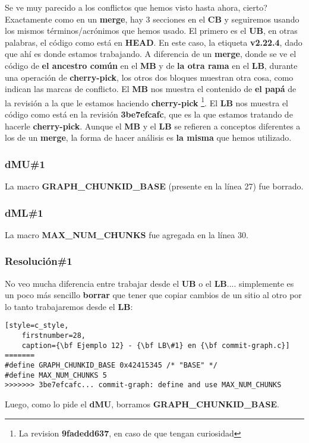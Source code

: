 Se ve muy parecido a los conflictos que hemos visto hasta ahora, cierto? Exactamente como en un {\bf merge}, hay 3 secciones
en el {\bf CB} y seguiremos usando los mismos términos/acrónimos que hemos usado. El primero es el {\bf UB}, en otras palabras,
el código como está en {\bf HEAD}. En este caso, la etiqueta {\bf v2.22.4}, dado que ahí es donde estamos trabajando. A diferencia
de un {\bf merge}, donde se ve el código de {\bf el ancestro común} en el {\bf MB} y de {\bf la otra rama} en el {\bf LB},
durante una operación de {\bf cherry-pick}, los otros dos bloques muestran otra cosa, como indican las marcas de conflicto.
El {\bf MB} nos muestra el contenido de {\bf el papá} de la revisión a la que le estamos haciendo {\bf cherry-pick}
\footnote{La revision {\bf 9fadedd637}, en caso de que tengan curiosidad}. El {\bf LB} nos muestra el código como está en la revisión
{\bf 3be7efcafc}, que es la que estamos tratando de hacerle {\bf cherry-pick}. Aunque el {\bf MB} y el {\bf LB} se refieren
a conceptos diferentes a los de un {\bf merge}, la forma de hacer análisis es {\bf la misma} que hemos utilizado.

\subsubsection{dMU\#1}
La macro {\bf GRAPH\_CHUNKID\_BASE} (presente en la línea 27) fue borrado.

\subsubsection{dML\#1}
La macro {\bf MAX\_NUM\_CHUNKS} fue agregada en la línea 30.

\subsubsection{Resolución\#1}
No veo mucha diferencia entre trabajar desde el {\bf UB} o el {\bf LB}.... simplemente es un poco más
sencillo {\bf borrar} que tener que copiar cambios de un sitio al otro por lo tanto trabajaremos desde
el {\bf LB}:

\begin{lstlisting}[style=c_style,
	firstnumber=28,
	caption={\bf Ejemplo 12} - {\bf LB\#1} en {\bf commit-graph.c}]
=======
#define GRAPH_CHUNKID_BASE 0x42415345 /* "BASE" */
#define MAX_NUM_CHUNKS 5
>>>>>>> 3be7efcafc... commit-graph: define and use MAX_NUM_CHUNKS
\end{lstlisting}

Luego, como lo pide el {\bf dMU}, borramos {\bf GRAPH\_CHUNKID\_BASE}.

